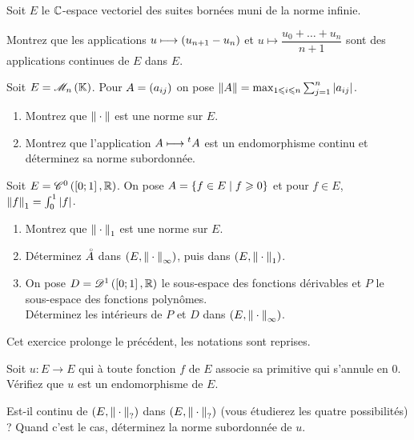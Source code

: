 \begin{exops}[Exercice 9]
Soit \(E\) le \(\mathbb{C}\)-espace vectoriel des suites bornées muni de la norme infinie.

Montrez que les applications \(u\longmapsto\left(u_{n+1}-u_n\right)\) et \(u\mapsto\dfrac{u_0+\dots+u_n}{n+1}\) sont des applications continues de \(E\) dans \(E\).
\end{exops}



\begin{exopss}[Exercice 10]
Soit \(E=\M{n}\). Pour \(A=\left(a_{ij}\right)\) on pose \(\norme{A}=\max_{1\leq i\leq n}\sum_{j=1}^n\abs{a_{ij}}\).

\begin{enumerate}
    \item Montrez que \(\norme{}\) est une norme sur \(E\). \\
    \item Montrez que l'application \(A\longmapsto\prescript{t}{}{A}\) est un endomorphisme continu et déterminez sa norme subordonnée.
\end{enumerate}
\end{exopss}



\begin{exoss}[Exercice 11]
Soit \(E=\mathscr{C}^{0}\left(\left[0;1\right],\mathbb{R}\right)\). On pose \(A=\left\lbrace f\in E\;\middle|\; f\geqslant0\right\rbrace\) et pour \(f\in E\), \(\norme{f}_1=\int_0^1\abs{f}\).

\begin{enumerate}
    \item Montrez que \(\norme{}_1\) est une norme sur \(E\). \\
    \item Déterminez \(\accentset{\circ}{A}\) dans \(\groupe{E}[\norme{}_\infty]\), puis dans \(\groupe{E}[\norme{}_1]\). \\
    \item On pose \(D=\mathscr{D}^1\left(\left[0;1\right],\mathbb{R}\right)\) le sous-espace des fonctions dérivables et \(P\) le sous-espace des fonctions polynômes. \\ Déterminez les intérieurs de \(P\) et \(D\) dans \(\groupe{E}[\norme{}_\infty]\).
\end{enumerate}
\end{exoss}



\begin{exoss}[Exercice 12]
Cet exercice prolonge le précédent, les notations sont reprises.

Soit \(u:E\to E\) qui à toute fonction \(f\) de \(E\) associe sa primitive qui s'annule en \(0\). Vérifiez que \(u\) est un endomorphisme de \(E\).

Est-il continu de \(\groupe{E}[\norme{}_?]\) dans \(\groupe{E}[\norme{}_?]\) (vous étudierez les quatre possibilités) ? Quand c'est le cas, déterminez la norme subordonnée de \(u\).
\end{exoss}



